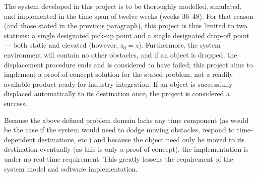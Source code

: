 The system developed in this project is to be thoroughly modelled, simulated, and implemented in the time span of twelve weeks (weeks 36--48).
For that reason (and those stated in the previous paragraph), this project is thus limited to two stations:
a single designated pick-up point and a single designated drop-off point  --- both static and elevated (however, $z_0 = z$).
Furthermore, the system environment will contain no other obstacles, and if an object is dropped, the displacement procedure ends and is considered to have failed;
this project aims to implement a proof-of-concept solution for the stated problem, not a readily available product ready for industry integration.
If an object is successfully displaced automatically to its destination once, the project is considered a success.

Because the above defined problem domain lacks any time component (as would be the case if the system would need to dodge moving obstacles, respond to time-dependent destinations, etc.)
and because the object need only be moved to its destination eventually (as this is only a proof of concept), the implementation is under no real-time requirement.
This greatly lessens the requirement of the system model and software implementation.
